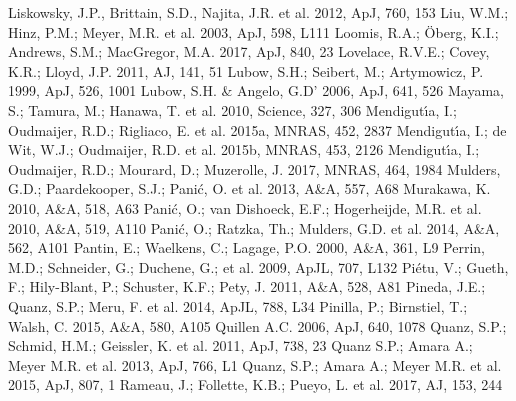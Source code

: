 \documentclass{aa}
\begin{document}
\begin{thebibliography}{}
 Liskowsky, J.P., Brittain, S.D., Najita, J.R. et al. 2012, ApJ, 760, 153
 Liu, W.M.; Hinz, P.M.; Meyer, M.R. et al. 2003, ApJ, 598, L111
 Loomis, R.A.; \"Oberg, K.I.; Andrews, S.M.; MacGregor, M.A. 2017, ApJ, 840, 23
 Lovelace, R.V.E.; Covey, K.R.; Lloyd, J.P. 2011, AJ, 141, 51
 Lubow, S.H.; Seibert, M.; Artymowicz, P. 1999, ApJ, 526, 1001
 Lubow, S.H. \& Angelo, G.D' 2006, ApJ, 641, 526  
 Mayama, S.; Tamura, M.; Hanawa, T. et al. 2010, Science, 327, 306
 Mendigut\'{\i}a, I.; Oudmaijer, R.D.; Rigliaco, E. et al. 2015a, MNRAS, 452, 2837
 Mendigut\'{\i}a, I.; de Wit, W.J.; Oudmaijer, R.D. et al. 2015b, MNRAS, 453, 2126
 Mendigut\'{\i}a, I.; Oudmaijer, R.D.; Mourard, D.; Muzerolle, J. 2017, MNRAS, 464, 1984
 Mulders, G.D.; Paardekooper, S.J.; Pani\'c, O. et al. 2013, A\&A, 557, A68
 Murakawa, K. 2010, A\&A, 518, A63
 Pani\'c, O.; van Dishoeck, E.F.; Hogerheijde, M.R. et al. 2010, A\&A, 519, A110
 Pani\'c, O.; Ratzka, Th.; Mulders, G.D. et al. 2014, A\&A, 562, A101
 Pantin, E.; Waelkens, C.; Lagage, P.O. 2000, A\&A, 361, L9
 Perrin, M.D.; Schneider, G.; Duchene, G.; et al. 2009, ApJL, 707, L132
 Pi\'etu, V.; Gueth, F.; Hily-Blant, P.; Schuster, K.F.; Pety, J. 2011, A\&A, 528, A81
 Pineda, J.E.; Quanz, S.P.; Meru, F. et al. 2014, ApJL, 788, L34
 Pinilla, P.; Birnstiel, T.; Walsh, C. 2015, A\&A, 580, A105
 Quillen A.C. 2006, ApJ, 640, 1078
 Quanz, S.P.; Schmid, H.M.; Geissler, K. et al. 2011, ApJ, 738, 23
 Quanz S.P.; Amara A.; Meyer M.R. et al. 2013, ApJ, 766, L1
 Quanz, S.P.; Amara A.; Meyer M.R. et al. 2015, ApJ, 807, 1
 Rameau, J.; Follette, K.B.; Pueyo, L. et al. 2017, AJ, 153, 244

\end{thebibliography}
\end{document}

